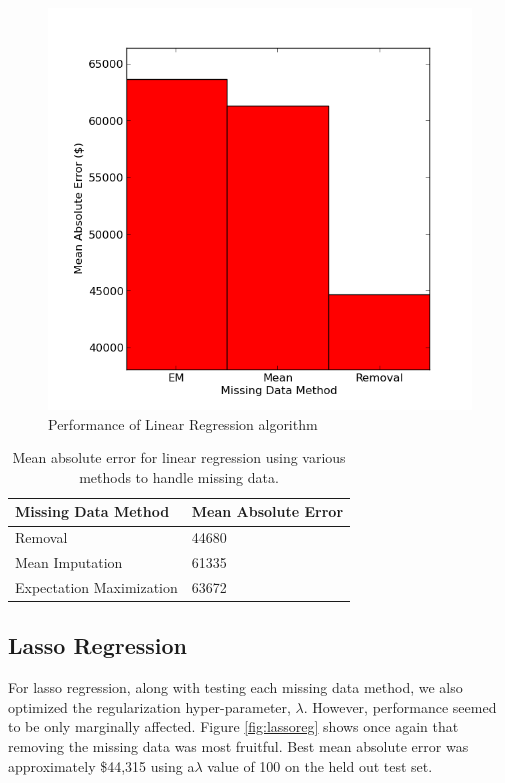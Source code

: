 \documentclass{acm_proc_article-sp}
\begin{document}
	 \begin{figure}[!htbp]
   		\centering
  		\includegraphics[width=\linewidth]{linear_regression_tuning.png}
    		\caption{Performance of Linear Regression algorithm}
    		\label{fig:linreg}
	\end{figure}
	\begin{center}
	
    \begin{table}	
    \begin{tabular}{| l | l |}
    \hline
    Missing Data Method & Mean Absolute Error \\ \hline
    \hline
    Removal & 44680 \\
    \hline
    Mean Imputation & 61335 \\
    \hline
    Expectation Maximization & 63672 \\
    \hline
    \end{tabular}
    \caption{Mean absolute error for linear regression using various methods to handle missing data.}
    \label{fig:linregres}
    \end{table}
\end{center}
\subsection{Lasso Regression}
	For lasso regression, along with testing each missing data method, we also optimized the regularization hyper-parameter, $\lambda$. However, performance seemed to be only marginally affected. Figure \ref{fig:lassoreg} shows once again that removing the missing data was most fruitful. Best mean absolute error was approximately \$44,315 using a$ \lambda$ value of 100 on the held out test set.
	
\end{document}
